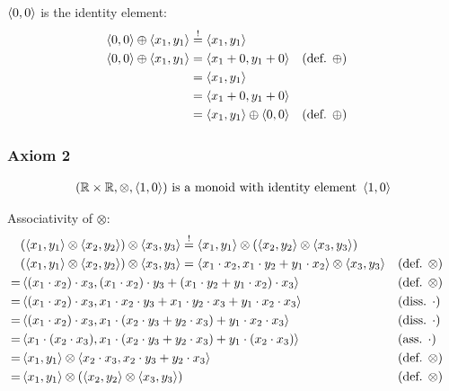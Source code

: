 \documentclass[a4paper,12pt]{ETHexercise}
\begin{document}
$\left\langle0, 0\right\rangle$ is the identity element:
\begin{align}
    \left\langle0, 0\right\rangle \oplus \left\langle x_1, y_1\right\rangle &\stackrel{!}{=} \left\langle x_1, y_1\right\rangle\\
    \left\langle0, 0\right\rangle \oplus \left\langle x_1, y_1\right\rangle &= \left\langle x_1+0, y_1+0\right\rangle &&(\text{def. } \oplus)\\
    &=  \left\langle x_1, y_1\right\rangle\\
    &=  \left\langle x_1 + 0, y_1 + 0\right\rangle\\
    &= \left\langle x_1, y_1\right\rangle \oplus \left\langle0, 0\right\rangle &&(\text{def. } \oplus)
\end{align}

\subsubsection*{Axiom 2}
\begin{align*}
    (\mathbb{R} \times \mathbb{R}, \otimes, \left\langle1, 0\right\rangle) \text{ is a monoid with identity element } \left\langle1, 0\right\rangle
\end{align*}

Associativity of $\otimes$:
\begin{align}
    &(\left\langle x_1, y_1\right\rangle \otimes \left\langle x_2, y_2\right\rangle) \otimes \left\langle x_3, y_3\right\rangle \stackrel{!}{=} \left\langle x_1, y_1\right\rangle \otimes (\left\langle x_2, y_2\right\rangle \otimes \left\langle x_3, y_3\right\rangle)\\
    &(\left\langle x_1, y_1\right\rangle \otimes \left\langle x_2, y_2\right\rangle) \otimes \left\langle x_3, y_3\right\rangle =
    \left\langle x_1 \cdot x_2, x_1 \cdot y_2 + y_1 \cdot x_2\right\rangle \otimes \left\langle x_3, y_3\right\rangle &&(\text{def. } \otimes)\\
    =  &\left\langle(x_1 \cdot x_2) \cdot x_3, (x_1 \cdot x_2) \cdot y_3 + (x_1 \cdot y_2 + y_1 \cdot x_2) \cdot x_3\right\rangle &&(\text{def. } \otimes)\\
    =  &\left\langle(x_1 \cdot x_2) \cdot x_3, x_1 \cdot x_2 \cdot y_3 + x_1 \cdot y_2 \cdot x_3 + y_1 \cdot x_2 \cdot x_3 \right\rangle &&(\text{diss. } \cdot)\\ 
    =  &\left\langle(x_1 \cdot x_2) \cdot x_3, x_1 \cdot (x_2 \cdot y_3 + y_2 \cdot x_3) + y_1 \cdot x_2 \cdot x_3 \right\rangle &&(\text{diss. } \cdot)\\
    =  &\left\langle x_1 \cdot( x_2 \cdot x_3), x_1 \cdot (x_2 \cdot y_3 + y_2 \cdot x_3) + y_1 \cdot (x_2 \cdot x_3) \right\rangle &&(\text{ass. } \cdot)\\
    =  &\left\langle x_1, y_1\right\rangle \otimes \left\langle x_2 \cdot x_3, x_2 \cdot y_3 + y_2 \cdot x_3\right\rangle &&(\text{def. } \otimes)\\
    =  &\left\langle x_1, y_1\right\rangle \otimes (\left\langle x_2, y_2\right\rangle \otimes \left\langle x_3, y_3\right\rangle) &&(\text{def. } \otimes)
\end{align}
\end{document}
